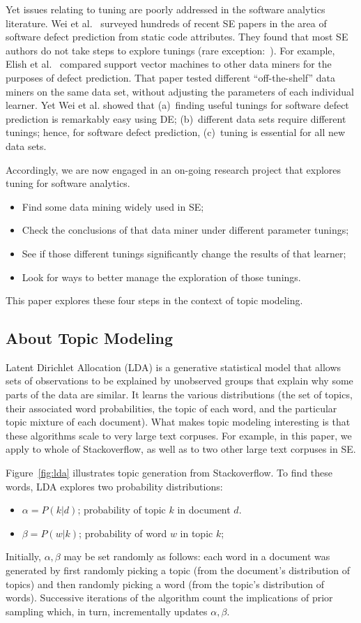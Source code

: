 \documentclass[10pt,conference]{IEEEtran}
\newcommand{\bi}{\begin{itemize}}
\newcommand{\ei}{\end{itemize}}
\theoremstyle{break}
\begin{document}
Yet issues relating to
tuning are poorly addressed in the software analytics literature.  Wei et al.~\cite{fu2016tuning} surveyed hundreds of recent SE papers in the area
of software defect prediction from static code attributes. They found that most SE
  authors do not take steps to explore tunings (rare exception:~\cite{tantithamthavorn2016icse}). For example, Elish et
  al.~\cite{elish2008predicting} compared support vector machines to other data
  miners for the purposes of defect prediction. That paper tested different
  “off-the-shelf” data miners on the same data set, without adjusting the
  parameters of each individual learner.  Yet Wei et al.
  showed that (a)~finding useful tunings for software defect prediction is remarkably
  easy using DE;  (b)~different data sets require
  different tunings; hence, for software defect prediction,  (c)~tuning is essential for  all
  new data sets.


Accordingly,  we are now engaged in an on-going research project that explores tuning for software analytics.
\bi
\item Find some data mining widely used in SE;
\item Check the conclusions of that data miner under different parameter tunings;
\item See if those different tunings significantly change the results of that learner;
\item Look for ways to better manage the exploration of those tunings.  \ei This
  paper explores these four steps in the context of topic modeling. 


  

\subsection{About Topic Modeling}\label{sect:tm}

Latent Dirichlet Allocation (LDA) is a generative statistical model that allows
sets of observations to be explained by unobserved groups that explain why some
parts of the data are similar. It learns the various distributions (the set of
topics, their associated word probabilities, the topic of each word, and the
particular topic mixture of each document).
What makes topic modeling interesting is that these algorithms scale to very
large text corpuses.  For example, in this paper, we apply to whole of Stackoverflow,
as well as to two other large text corpuses in SE.

Figure~\ref{fig:lda} illustrates topic generation from Stackoverflow.
To find these words, LDA explores two probability distributions:
\bi
\item $\alpha=P(k|d)$; probability of topic $k$ in  document $d$.
\item $\beta=P(w|k)$; probability of word $w$ in topic $k$; 
\ei
  Initially, $\alpha,\beta$ may be set randomly as follows:
each word in a document was generated by first randomly picking a topic (from
the document’s distribution of topics) and then randomly picking a word (from
the topic’s distribution of words). Successive iterations of the algorithm 
count the implications of prior sampling which, in turn,  incrementally updates $\alpha,\beta$.
\end{document}
